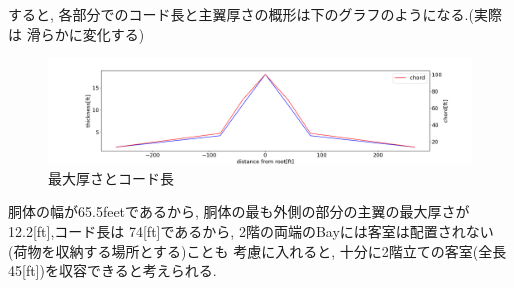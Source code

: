 \documentclass[class=article, crop=false, dvipdfmx, fleqn]{standalone}
\begin{document}
すると, 各部分でのコード長と主翼厚さの概形は下のグラフのようになる.(実際は
滑らかに変化する)
\begin{figure}[H]
  \includegraphics[width=12cm]{../images/wingthickness.png}
  \caption{最大厚さとコード長}
  \label{fig::thickness}
\end{figure}
胴体の幅が65.5feetであるから, 胴体の最も外側の部分の主翼の最大厚さが12.2[ft],コード長は
74[ft]であるから, 2階の両端のBayには客室は配置されない(荷物を収納する場所とする)ことも
考慮に入れると, 十分に2階立ての客室(全長45[ft])を収容できると考えられる.
\end{document}
